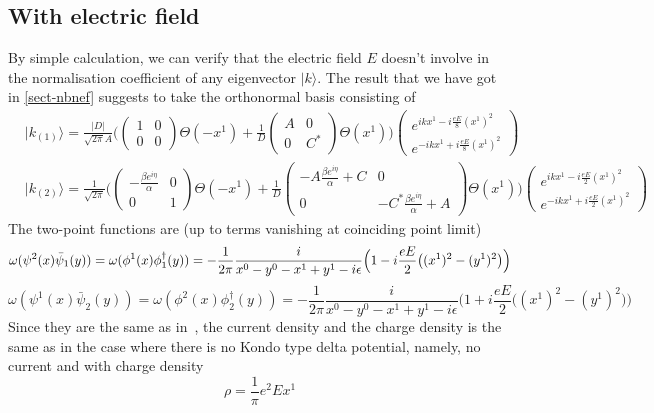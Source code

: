 \subsection{With electric field}
By simple calculation, we can verify that the electric field $E$ doesn't involve in the normalisation coefficient of any eigenvector $ | k \rangle$. The result that we have got in \cref{sect-nbnef} suggests to take the orthonormal basis consisting of
\begin{equation}
\begin{split}
& | k_{(1)} \rangle = \frac{|D|}{\sqrt{2\pi}A}\bigg( \begin{pmatrix} 1 & 0 \\ 0 & 0 \end{pmatrix}
\Theta(-x^1) + 
\frac{1}{D}\begin{pmatrix} A & 0 \\  0 & C^* \end{pmatrix} \Theta(x^1) \bigg)
\begin{pmatrix} e^{ikx^1 - i\frac{eE}{8}(x^1)^2}  \\ e^{-ikx^1 + i\frac{eE}{8}(x^1)^2} \end{pmatrix}   \\
& | k_{(2)} \rangle = \frac{1}{\sqrt{2\pi}}
\Bigg( \begin{pmatrix} -\frac{\beta e^{i\eta}}{\alpha} & 0 \\ 0 & 1 \end{pmatrix}
\Theta(-x^1) + 
\frac{1}{D}\begin{pmatrix} -A\frac{\beta e^{i\eta}}{\alpha} + C  & 0\\ 0&  -C^*\frac{\beta e^{i\eta}}{\alpha} + A  \end{pmatrix} \Theta(x^1) \Bigg)
\begin{pmatrix} e^{ikx^1 -i\frac{eE}{2}(x^1)^2}  \\  e^{-ikx^1 +i\frac{eE}{2}(x^1)^2}  \end{pmatrix}  
\end{split}
\end{equation}
The two-point functions are (up to terms vanishing at coinciding point limit)
\begin{equation*}
\omega(\psi^2(x)\bar{\psi}_1(y)) =  \omega(\phi^1(x)\phi^\dagger_1(y)) \\ = -\frac{1}{2\pi}\frac{i}{x^0 - y^0 - x^1 + y^1 - i\epsilon} \Big(1 -  i\frac{eE}{2}\big((x^1)^2 - (y^1)^2 \big) \Big) 
\end{equation*}
\begin{equation*}
\omega(\psi^1(x)\bar{\psi}_2(y))   =  \omega(\phi^2(x)\phi^\dagger_2(y)) = -\frac{1}{2\pi}\frac{i}{x^0 - y^0 - x^1 + y^1 - i\epsilon} \Big(1 + i\frac{eE}{2}\big((x^1)^2 - (y^1)^2 \big) \Big)
\end{equation*}
Since they are the same as in~\cite{Zahn2015}, the current density and the charge density is the same as in the case where there is no Kondo type delta potential, namely, no current and with charge density 
\begin{equation}\label{vacuum-charge_nbdy}
\rho = \frac{1}{\pi} e^2 E x^1
\end{equation}
